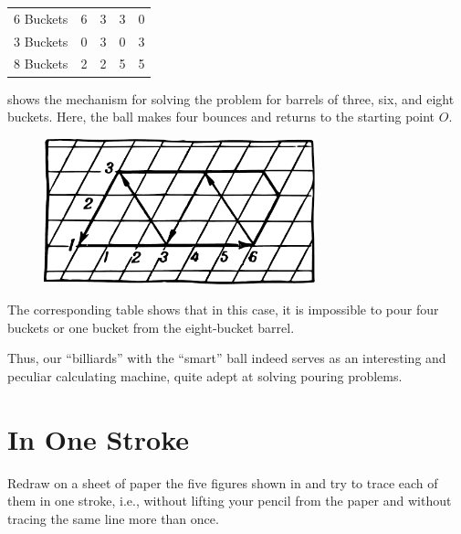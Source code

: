 \begin{small}
\begin{center}
\begin{tabular}{@{}r *{4}{c}@{}}
\toprule
6 Buckets & 6  & 3 & 3 & 0 \\
3 Buckets & 0 & 3 & 0 & 3  \\
8 Buckets & 2 & 2 & 5 & 5  \\ 
\bottomrule
\end{tabular}
\end{center}
\end{small}


 shows the mechanism for solving the problem for barrels of three, six, and eight buckets. Here, the ball makes four bounces and returns to the starting point $O$.


\begin{figure}[h!]
\centering
\includegraphics[width=0.7\textwidth]{figures/ch-10/fig-154.pdf}
\end{figure}


The corresponding table shows that in this case, it is impossible to pour four buckets or one bucket from the eight-bucket barrel.

Thus, our ``billiards'' with the ``smart'' ball indeed serves as an interesting and peculiar calculating machine, quite adept at solving pouring problems.


\section{In One Stroke}
\label{sec-10.9}



\ques Redraw on a sheet of paper the five figures shown in  and try to trace each of them in one stroke, i.e., without lifting your pencil from the paper and without tracing the same line more than once.



